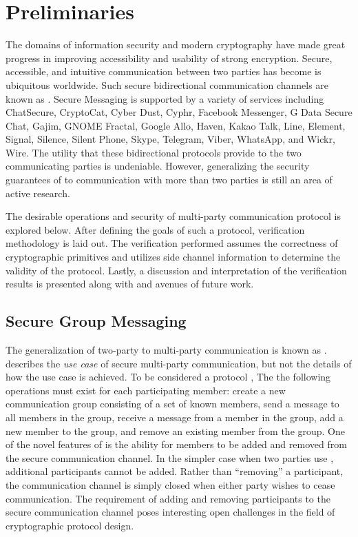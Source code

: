 \hypertarget{preliminaries}{%
\chapter{Preliminaries}\label{preliminaries}}

The domains of information security and modern cryptography have made great progress in improving accessibility and usability of strong encryption.
Secure, accessible, and intuitive communication between two parties has become is ubiquitous worldwide.
Such secure bidirectional communication channels are known as .
Secure Messaging is supported by a variety of services including ChatSecure, CryptoCat, Cyber Dust, Cyphr, Facebook Messenger, G Data Secure Chat, Gajim, GNOME Fractal, Google Allo, Haven, Kakao Talk, Line, Element, Signal, Silence, Silent Phone, Skype, Telegram, Viber, WhatsApp, and Wickr, Wire.
The utility that these bidirectional protocols provide to the two communicating parties is undeniable.
However, generalizing the security guarantees of  to communication with more than two parties is still an area of active research.

The desirable operations and security of multi-party communication protocol is explored below.
After defining the goals of such a protocol, verification methodology is laid out.
The verification performed assumes the correctness of cryptographic primitives and utilizes side channel information to determine the validity of the protocol.
Lastly, a discussion and interpretation of the verification results is presented along with and avenues of future work.


\hypertarget{secure-group-messaging}{%
\section{Secure Group Messaging}\label{secure-group-messaging}}

The generalization of two-party  to multi-party communication is known as .
 describes the \emph{use case} of secure multi-party communication, but not the details of how the use case is achieved.
To be considered a  protocol \autocite{ietf-mls-protocol-14}, The  the following operations must exist for each participating member: create a new communication group consisting of a set of known members, send a message to all members in the group, receive a message from a member in the group, add a new member to the group, and remove an existing member from the group.
One of the novel features of  is the ability for members to be added and removed from the secure communication channel.
In the simpler case when two parties use , additional participants cannot be added.
Rather than ``removing'' a participant, the communication channel is simply closed when either party wishes to cease communication.
The  requirement of adding and removing participants to the secure communication channel poses interesting open challenges in the field of cryptographic protocol design.


